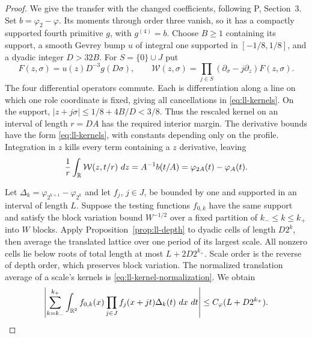 \begin{proof}
We give the transfer with the changed coefficients, following P,
Section~3.  Set $b=\varphi_2-\varphi$.  Its moments through order
three vanish, so it has a compactly supported fourth primitive $g$,
with $g^{(4)}=b$.  Choose $B\ge1$ containing its support, a smooth
Gevrey bump $u$ of integral one supported in $[-1/8,1/8]$, and a
dyadic integer $D>32B$.  For $S=\{0\}\cup J$ put
\[
 F(z,\sigma)=u(z)D^{-3}g(D\sigma),\qquad
 \mathcal W(z,\sigma)=
       \prod_{j\in S}(\partial_\sigma-j\partial_z)F(z,\sigma).
\]
The four differential operators commute.  Each is differentiation
along a line on which one role coordinate is fixed, giving all
cancellations in \eqref{eq:ll-kernels}.  On the support,
$|z+j\sigma|\le1/8+4B/D<3/8$.  Thus the rescaled kernel on an
interval of length $r=DA$ has the required interior margin.
The derivative bounds have the form \eqref{eq:ll-kernels}, with
constants depending only on the profile.  Integration in $z$ kills
every term containing a $z$ derivative, leaving
\begin{equation}
 \frac1r\int_\mathbb R\mathcal W(z,t/r)\,\,d z
 =A^{-1}b(t/A)=\varphi_{2A}(t)-\varphi_A(t).
 \label{eq:ll-kernel-normalization}
\end{equation}

Let $\Delta_k=\varphi_{2^{k+1}}-\varphi_{2^k}$ and let $f_j$,
$j\in J$, be bounded by one and supported in an interval of length
$L$.  Suppose the testing functions $f_{0,k}$ have the same support
and satisfy the block variation bound $W^{-1/2}$ over a fixed
partition of $k_-\le k\le k_+$ into $W$ blocks.  Apply
Proposition~\ref{prop:ll-depth} to dyadic cells of length $D2^k$,
then average the translated lattice over one period of its largest
scale.  All nonzero cells lie below roots of total length at most
$L+2D2^{k_+}$.  Scale order is the reverse of depth order, which
preserves block variation.  The normalized translation average
of a scale's kernels is \eqref{eq:ll-kernel-normalization}.
We obtain
\begin{equation}
 \left|\sum_{k=k_-}^{k_+}\int_{\mathbb R^2}
     f_{0,k}(x)\prod_{j\in J}f_j(x+jt)\Delta_k(t)
       \,\,d x\,\,d t\right|
 \le C_\varphi(L+D2^{k_+}).
 \label{eq:ll-continuous-test}
\end{equation}


\end{proof}
